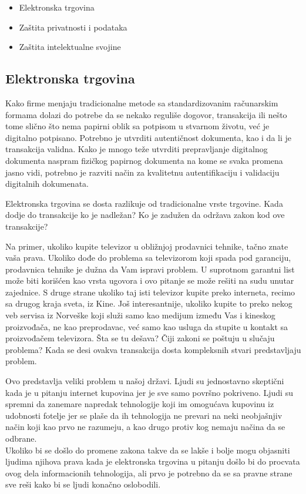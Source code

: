 \documentclass[a4paper]{article}
\begin{document}
{\begin{itemize}
\item{Elektronska trgovina}
\item{Zaštita privatnosti i podataka}
\item{Zaštita intelektualne svojine}
\end{itemize}

\subsection{Elektronska trgovina}

Kako firme menjaju tradicionalne metode sa standardizovanim ra\-ču\-na\-rskim formama dolazi do potrebe da se nekako reguliše dogovor, transakcija ili nešto tome slično što nema papirni oblik sa potpisom u stvarnom životu, već je digitalno potpisano. Potrebno je utvrditi autentičnost dokumenta, kao i da li je transakcija validna. Kako je mnogo teže utvrditi prepravljanje digitalnog dokumenta naspram fizičkog papirnog dokumenta na kome se svaka promena jasno vidi, potrebno je razviti način za kvalitetnu autentifikaciju i validaciju digitalnih dokumenata.\cite{Legal_issues}

Elektronska trgovina se dosta razlikuje od tradicionalne vrste trgovine. Kada dodje do transakcije ko je nadležan? Ko je zadužen da održava zakon kod ove transakcije?

Na primer, ukoliko kupite televizor u obližnjoj prodavnici tehnike, tačno znate vaša prava. Ukoliko dođe do problema sa televizorom koji spada pod garanciju, prodavnica tehnike je dužna da Vam ispravi problem. U suprotnom garantni list može biti korišćen kao vrsta ugovora i ovo pitanje se može rešiti na sudu unutar zajednice. S druge strane ukoliko taj isti televizor kupite preko interneta, recimo sa drugog kraja sveta, iz Kine. Još interesantnije, ukoliko kupite to preko nekog veb servisa iz Norveške koji služi samo kao medijum između Vas i kineskog proizvođača, ne kao preprodavac, već samo kao usluga da stupite u kontakt sa proizvođačem televizora. Šta se tu dešava? Čiji zakoni se poštuju u slučaju problema? Kada se desi ovakva transakcija dosta kompleksnih stvari predstavljaju problem.

Ovo predstavlja veliki problem u našoj državi. Ljudi su jednostavno skeptični kada je u pitanju internet kupovina jer je sve samo površno pokriveno. Ljudi su spremni da zanemare napredak tehnologije koji im omogućava kupovinu iz udobnosti fotelje jer se plaše da ih tehnologija ne prevari na neki neobjašnjiv način koji kao prvo ne razumeju, a kao drugo protiv kog nemaju načina da se odbrane. \\ Ukoliko bi se došlo do promene zakona takve da se lakše i bolje mogu objasniti ljudima njihova prava kada je elektronska trgovina u pitanju došlo bi do procvata ovog dela informacionih tehnologija, ali prvo je potrebno da se sa pravne strane sve reši kako bi se ljudi konačno oslobodili.

}
\end{document}
